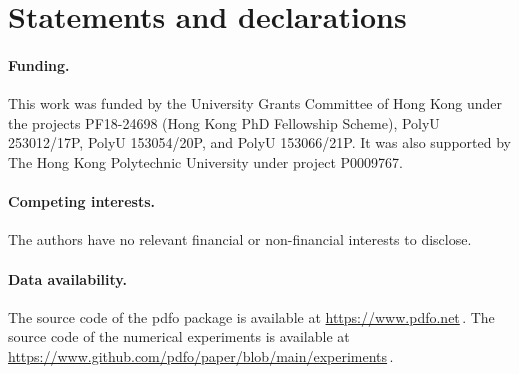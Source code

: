\documentclass[
    smallextended,  %
    draft,          %
    final,          %
]{svjour3}
\begin{document}
\section*{Statements and declarations}

\paragraph{\textnormal{\textbf{Funding.}}}

This work was funded by the University Grants Committee of Hong Kong under the
projects PF18-24698 (Hong Kong PhD Fellowship Scheme), PolyU 253012/17P, PolyU 153054/20P,
and PolyU 153066/21P.
It was also supported by The Hong Kong Polytechnic University under project P0009767.

\paragraph{\textnormal{\textbf{Competing interests.}}}

The authors have no relevant financial or non-financial interests to disclose.

\paragraph{\textnormal{\textbf{Data availability.}}}

The source code of the \gls{pdfo} package is available at \mbox{\url{https://www.pdfo.net}}\,.
The source code of the numerical experiments is available at
\mbox{\url{https://www.github.com/pdfo/paper/blob/main/experiments}}\,.



\end{document}
